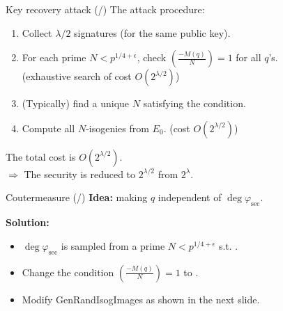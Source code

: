 \begin{frame}{Key recovery attack (/\attacktotal{})}
    The attack procedure:
    \begin{enumerate}
        \item Collect $\lambda/2$ signatures (for the same public key).
        \item For each prime $N < p^{1/4+\epsilon}$, 
            check $\left(\frac{-M(q)}{N}\right) = 1$ for all $q$'s.\\
            (exhaustive search of cost $O(2^{\lambda/2})$)
        \item (Typically) find a unique $N$ satisfying the condition.
        \item Compute all $N$-isogenies from $E_0$. (cost $O(2^{\lambda/2})$)
    \end{enumerate}

    \vspace{10pt}
    The total cost is $O(2^{\lambda/2})$.\\[5pt]
    $\Rightarrow$ The security is reduced to $2^{\lambda/2}$ from $2^\lambda$.
\end{frame}

\newcommand*{\countermeasuretotal}{\total{countermeasurecnt}}
\begin{frame}{Coutermeasure (/\countermeasuretotal{})}
    \textbf{Idea:}
    making $q$ independent of $\deg\varphi_\mathrm{sec}$.

    \vspace{10pt}
    \textbf{Solution:}
    \begin{itemize}
        \item $\deg\varphi_\mathrm{sec}$ is sampled from
            a prime $N < p^{1/4+\epsilon}$ s.t. .
        \item Change the condition $\left(\frac{-M(q)}{N}\right) = 1$ to
            .
        \item Modify \textsf{GenRandIsogImages} as shown in the next slide.
            \iffalse
            $\left(\frac{-M(q)}{N}\right) = 1 \Rightarrow$ compute $\alpha \in \End(E_\mathrm{pub})$ s.t. $\deg\alpha = M(q)$.\\[5pt]
            $\left(\frac{-M(q)}{N}\right) = -1$ (so $\left(\frac{-M(q)/3}{N}\right) = 1$)\\
                    $\Rightarrow$ compute $\alpha \in \End(E_\mathrm{pub})$ s.t. $\deg\alpha = M(q)/3$\\
                    \hphantom{$\Rightarrow$} and compute a random $3$-isogeny $\varphi_3: E_\mathrm{pub} \to E_3$.\\
                    \hphantom{$\Rightarrow$} Then, $\deg(\varphi_3 \circ \alpha) = M(q)$
            \fi
    \end{itemize}
\end{frame}

